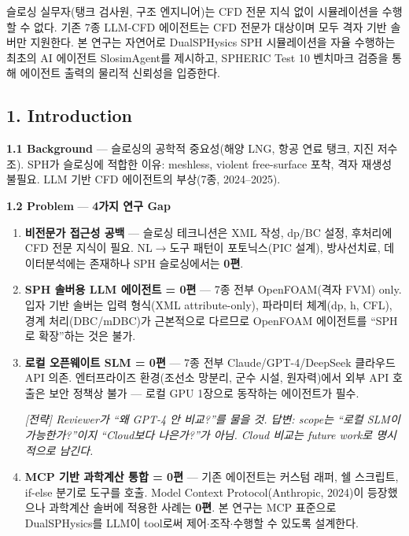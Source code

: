 \documentclass[12pt,a4paper]{article}
\begin{document}
슬로싱 실무자(탱크 검사원, 구조 엔지니어)는 CFD 전문 지식 없이 시뮬레이션을 수행할 수 없다.
기존 7종 LLM-CFD 에이전트는 CFD 전문가 대상이며 모두 격자 기반 솔버만 지원한다.
본 연구는 자연어로 DualSPHysics SPH 시뮬레이션을 자율 수행하는 최초의 AI 에이전트
SlosimAgent를 제시하고, SPHERIC Test 10 벤치마크 검증을 통해
에이전트 출력의 물리적 신뢰성을 입증한다.

\subsection{1. Introduction}

\textbf{1.1 Background} ---
슬로싱의 공학적 중요성(해양 LNG, 항공 연료 탱크, 지진 저수조).
SPH가 슬로싱에 적합한 이유: meshless, violent free-surface 포착, 격자 재생성 불필요.
LLM 기반 CFD 에이전트의 부상(7종, 2024--2025).

\textbf{1.2 Problem} --- \textbf{4가지 연구 Gap}

\begin{enumerate}[leftmargin=2em]
\item[\textbf{G0}] \textbf{비전문가 접근성 공백} ---
슬로싱 테크니션은 XML 작성, dp/BC 설정, 후처리에 CFD 전문 지식이 필요.
NL$\rightarrow$도구 패턴이 포토닉스(PIC 설계), 방사선치료, 데이터분석에는 존재하나
SPH 슬로싱에서는 \textbf{0편}.

\item[\textbf{G1}] \textbf{SPH 솔버용 LLM 에이전트 = 0편} ---
7종 전부 OpenFOAM(격자 FVM) only.
입자 기반 솔버는 입력 형식(XML attribute-only), 파라미터 체계(dp, h, CFL),
경계 처리(DBC/mDBC)가 근본적으로 다르므로 OpenFOAM 에이전트를 ``SPH로 확장''하는 것은 불가.

\item[\textbf{G2}] \textbf{로컬 오픈웨이트 SLM = 0편} ---
7종 전부 Claude/GPT-4/DeepSeek 클라우드 API 의존.
엔터프라이즈 환경(조선소 망분리, 군수 시설, 원자력)에서 외부 API 호출은
보안 정책상 불가 --- 로컬 GPU 1장으로 동작하는 에이전트가 필수.

{\color{strategy}\textit{[전략] Reviewer가 ``왜 GPT-4 안 비교?''를 물을 것.
답변: scope는 ``로컬 SLM이 가능한가?''이지 ``Cloud보다 나은가?''가 아님.
Cloud 비교는 future work로 명시적으로 남긴다.}}

\item[\textbf{G3}] \textbf{MCP 기반 과학계산 통합 = 0편} ---
기존 에이전트는 커스텀 래퍼, 쉘 스크립트, if-else 분기로 도구를 호출.
Model Context Protocol(Anthropic, 2024)이 등장했으나
과학계산 솔버에 적용한 사례는 \textbf{0편}.
본 연구는 MCP 표준으로 DualSPHysics를 LLM이 tool로써
제어$\cdot$조작$\cdot$수행할 수 있도록 설계한다.
\end{enumerate}
\end{document}
